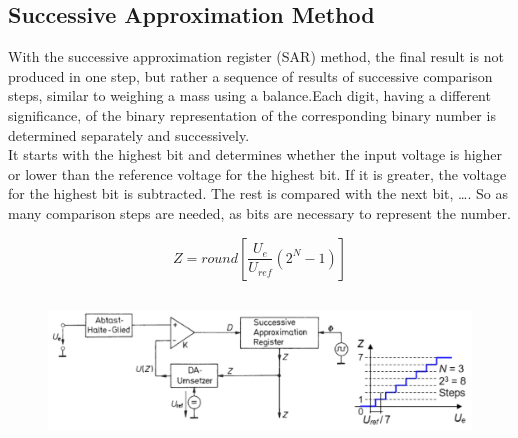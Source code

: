 
\os{\newpage}

\subsection{Successive Approximation Method}

With the successive approximation register (SAR) method, the final result is not produced in one step, but rather a sequence of results of successive comparison steps, similar to weighing a mass using a balance.Each digit, having a different significance, of the binary representation of the corresponding binary number is determined separately and successively.\\

It starts with the highest bit and determines whether the input voltage is higher or lower than the reference voltage for the highest bit. If it is greater, the voltage for the highest bit is subtracted. The rest is compared with the next bit, {\dots}. So as many comparison steps are needed, as bits are necessary to represent the number.

\[Z=round\left[\frac{U_{e} }{U_{ref} } \left(2^{N} -1\right)\right]\] 
    \begin{figure}[h]
    \centering
    \includegraphics[width=13cm, height=4cm]{Images/image176.png}
    \label{fig:Fig 130}
    \end{figure}


